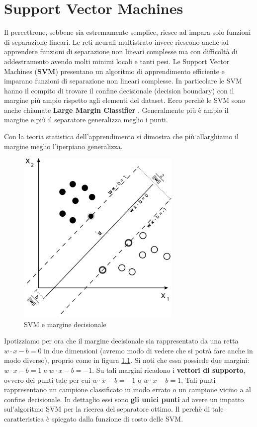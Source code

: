 \chapter{Support Vector Machines}
Il percettrone, sebbene sia estremamente semplice, riesce ad impara solo funzioni di separazione lineari. Le reti neurali multistrato invece riescono anche ad apprendere funzioni di separazione non lineari complesse ma con
difficoltà di addestramento avendo molti minimi locali e tanti pesi. Le Support Vector Machines (\textbf{SVM}) presentano un algoritmo di apprendimento efficiente e imparano funzioni di
separazione non lineari complesse.
In particolare le SVM hanno il compito di trovare il confine decisionale (decision boundary) con il margine più ampio rispetto agli elementi del dataset. Ecco perchè le SVM sono anche chiamate \textbf{Large Margin Classifier} \cite{SVMTowardDataScience}.
Generalmente più è ampio il margine e più il separatore generalizza meglio i punti.
\begin{definizione}
  Con la teoria statistica dell’apprendimento si
dimostra che più allarghiamo il margine meglio
l’iperpiano generalizza.
\end{definizione}
\begin{figure}[H]
    \centering
    \includegraphics[width=0.7\textwidth]{img/Svm_max_sep_hyperplane_with_margin.png}
    \caption{SVM e margine decisionale}
    \label{fig:svm}
\end{figure}
Ipotizziamo per ora che il margine decisionale sia rappresentato da una retta $w\cdot x - b = 0$ in due dimensioni (avremo modo di vedere che si potrà fare anche in modo diverso), proprio come in figura \ref{fig:svm}. Si noti che essa possiede due margini: $w\cdot x - b = 1$ e $w\cdot x - b = -1$. Su tali margini ricadono i \textbf{vettori di supporto}, ovvero dei punti tale per cui $w\cdot x - b = -1$ o $w\cdot x - b = 1$. Tali punti rappresentano un campione classificato in modo errato o un campione vicino a al confine decisionale. In dettaglio essi sono \textbf{gli unici punti} ad avere un impatto sul'algoritmo SVM per la ricerca del separatore ottimo. Il perchè di tale caratteristica è spiegato dalla funzione di costo delle SVM.
